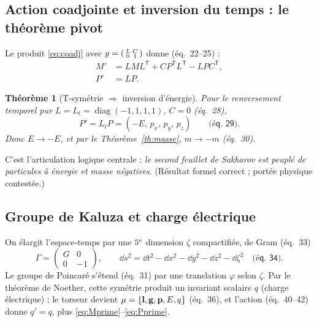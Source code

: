 \documentclass[11pt,a4paper]{article}
\theoremstyle{definition}
\theoremstyle{plain}
\newtheorem{theoreme}{Théorème}[section]
\newcommand{\diag}{\operatorname{diag}}
\newcommand{\eqpaper}[1]{\textsf{(éq.~#1)}}   %
\begin{document}
\subsection{Action coadjointe et inversion du temps : le théorème pivot}

Le produit \eqref{eq:coadj} avec $g=\begin{psmallmatrix}L&C\\0&1\end{psmallmatrix}$ donne
\eqpaper{22--25} :
\begin{align}
M'&=LML^{\mathsf T}+CP^{\mathsf T}L^{\mathsf T}-LPC^{\mathsf T}, \label{eq:Mprime}\\
P'&=LP. \label{eq:Pprime}
\end{align}

\begin{theoreme}[T-symétrie $\Rightarrow$ inversion d'énergie]
\label{th:Tinv}
Pour le renversement temporel pur $L=L_t=\diag(-1,1,1,1)$, $C=0$ \eqpaper{28},
\begin{equation}
P'=L_t P=(-E,\,p_x,\,p_y,\,p_z)\qquad\eqpaper{29}.
\end{equation}
Donc $E\to-E$, et par le Théorème~\ref{th:masse}, $m\to-m$ \eqpaper{30}.
\end{theoreme}

C'est l'articulation logique centrale : \emph{le second feuillet de Sakharov est peuplé de
particules à énergie et masse négatives}. (Résultat formel correct ; portée physique
contestée.)

\subsection{Groupe de Kaluza et charge électrique}

On élargit l'espace-temps par une $5^{\text e}$ dimension $\zeta$ compactifiée, de Gram
\eqpaper{33}
\begin{equation}
\Gamma=\begin{pmatrix} G & 0\\ 0 & -1\end{pmatrix},\qquad
\dd s^2=\dd t^2-\dd x^2-\dd y^2-\dd z^2-\dd\zeta^2 \quad\eqpaper{34}.
\end{equation}
Le groupe de Poincaré s'étend \eqpaper{31} par une translation $\varphi$ selon $\zeta$.
Par le théorème de Noether, cette symétrie produit un invariant scalaire $q$ (charge
électrique) ; le torseur devient $\mu=\{\vb l,\vb g,\vb p,E,q\}$ \eqpaper{36}, et l'action
\eqpaper{40--42} donne $q'=q$, plus \eqref{eq:Mprime}--\eqref{eq:Pprime}.
\end{document}
